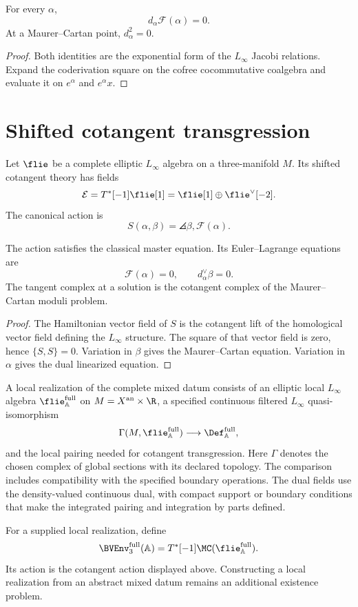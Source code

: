 \begin{theorem}
For every $\alpha$,
\[
 d_\alpha\mathcal F(\alpha)=0.
\]
At a Maurer--Cartan point, $d_\alpha^2=0$.
\end{theorem}
\begin{proof}
Both identities are the exponential form of the $L_\infty$ Jacobi relations.  Expand the coderivation square on the cofree cocommutative coalgebra and evaluate it on $e^\alpha$ and $e^\alpha x$.
\end{proof}

\chapter{Shifted cotangent transgression}
Let $\flie$ be a complete elliptic $L_\infty$ algebra on a three-manifold $M$.  Its shifted cotangent theory has fields
\[
 \mathcal E=T^*[-1]\flie[1]
 =\flie[1]\oplus\flie^\vee[-2].
\]
The canonical action is
\[
 S(\alpha,\beta)
 =\angles{\beta,\mathcal F(\alpha)}.
\]

\begin{theorem}
The action satisfies the classical master equation.  Its Euler--Lagrange equations are
\[
 \mathcal F(\alpha)=0,
 \qquad
 d_\alpha^\vee\beta=0.
\]
The tangent complex at a solution is the cotangent complex of the Maurer--Cartan moduli problem.
\end{theorem}
\begin{proof}
The Hamiltonian vector field of $S$ is the cotangent lift of the homological vector field defining the $L_\infty$ structure.  The square of that vector field is zero, hence $\{S,S\}=0$.  Variation in $\beta$ gives the Maurer--Cartan equation.  Variation in $\alpha$ gives the dual linearized equation.
\end{proof}

\begin{definition}
A local realization of the complete mixed datum consists of an elliptic local $L_\infty$ algebra $\flie_{\mathbb A}^{\mathrm{full}}$ on $M=X^{\mathrm{an}}\times\R$, a specified continuous filtered $L_\infty$ quasi-isomorphism
\[
 \Gamma(M,\flie_{\mathbb A}^{\mathrm{full}})
 \longrightarrow \Def_{\mathbb A}^{\mathrm{full}},
\]
and the local pairing needed for cotangent transgression. Here $\Gamma$ denotes the chosen complex of global sections with its declared topology. The comparison includes compatibility with the specified boundary operations. The dual fields use the density-valued continuous dual, with compact support or boundary conditions that make the integrated pairing and integration by parts defined.

For a supplied local realization, define
\[
 \BVEnv_3^{\mathrm{full}}(\mathbb A)
 =T^*[-1]\MC(\flie_{\mathbb A}^{\mathrm{full}}).
\]
Its action is the cotangent action displayed above. Constructing a local realization from an abstract mixed datum remains an additional existence problem.
\end{definition}

